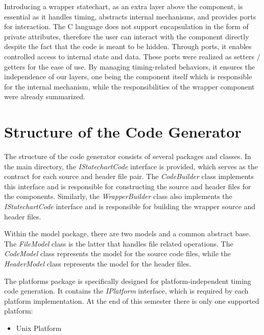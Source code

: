 Introducing a wrapper statechart, as an extra layer above the component, is essential as it handles timing, abstracts internal mechanisms, and provides ports for interaction. The C language does not support encapsulation in the form of private attributes, therefore the user can interact with the component directly despite the fact that the code is meant to be hidden. Through ports, it enables controlled access to internal state and data. These ports were realized as setters / getters for the ease of use. By managing timing-related behaviors, it ensures the independence of our layers, one being the component itself which is responsible for the internal mechanism, while the responsibilities of the wrapper component were already summarized.

\section{Structure of the Code Generator}

The structure of the code generator consists of several packages and classes. In the main directory, the \textit{IStatechartCode} interface is provided, which serves as the contract for each source and header file pair. The \textit{CodeBuilder} class implements this interface and is responsible for constructing the source and header files for the components. Similarly, the \textit{WrapperBuilder} class also implements the \textit{IStatechartCode} interface and is responsible for building the wrapper source and header files.

Within the model package, there are two models and a common abstract base. The \textit{FileModel} class is the latter that handles file related operations. The \textit{CodeModel} class represents the model for the source code files, while the \textit{HeaderModel} class represents the model for the header files.

The platforms package is specifically designed for platform-independent timing code generation. It contains the \textit{IPlatform} interface, which is required by each platform implementation. At the end of this semester there is only one supported platform:

\begin{itemize}
	\item Unix Platform
\end{itemize}

